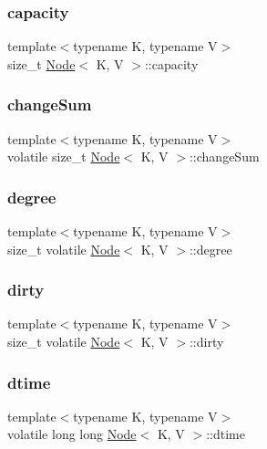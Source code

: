 \subsubsection{\texorpdfstring{capacity}{capacity}}
{\footnotesize\ttfamily template$<$typename K, typename V$>$ \\
size\+\_\+t \hyperlink{classNode}{Node}$<$ K, V $>$\+::capacity}

\mbox{\label{classNode_af94bd72d91f93e528c76778a60f5312e}} 
\subsubsection{\texorpdfstring{change\+Sum}{changeSum}}
{\footnotesize\ttfamily template$<$typename K, typename V$>$ \\
volatile size\+\_\+t \hyperlink{classNode}{Node}$<$ K, V $>$\+::change\+Sum}

\mbox{\label{classNode_a2dd213b9ec29f7a388aecbf3745028ab}} 
\subsubsection{\texorpdfstring{degree}{degree}}
{\footnotesize\ttfamily template$<$typename K, typename V$>$ \\
size\+\_\+t volatile \hyperlink{classNode}{Node}$<$ K, V $>$\+::degree}

\mbox{\label{classNode_af8f8003d96ba90f4f5acd5c003386b08}} 
\subsubsection{\texorpdfstring{dirty}{dirty}}
{\footnotesize\ttfamily template$<$typename K, typename V$>$ \\
size\+\_\+t volatile \hyperlink{classNode}{Node}$<$ K, V $>$\+::dirty}

\mbox{\label{classNode_af7ad969e3edbea0602b1a653f9ba0a7c}} 
\subsubsection{\texorpdfstring{dtime}{dtime}}
{\footnotesize\ttfamily template$<$typename K, typename V$>$ \\
volatile long long \hyperlink{classNode}{Node}$<$ K, V $>$\+::dtime}

